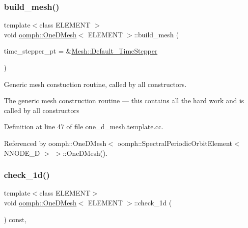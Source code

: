 \subsubsection{\texorpdfstring{build\+\_\+mesh()}{build\_mesh()}}
{\footnotesize\ttfamily template$<$class E\+L\+E\+M\+E\+NT $>$ \\
void \hyperlink{classoomph_1_1OneDMesh}{oomph\+::\+One\+D\+Mesh}$<$ E\+L\+E\+M\+E\+NT $>$\+::build\+\_\+mesh (\begin{DoxyParamCaption}\item[{\hyperlink{classoomph_1_1TimeStepper}{Time\+Stepper} $\ast$}]{time\+\_\+stepper\+\_\+pt = {\ttfamily \&\hyperlink{classoomph_1_1Mesh_a12243d0fee2b1fcee729ee5a4777ea10}{Mesh\+::\+Default\+\_\+\+Time\+Stepper}} }\end{DoxyParamCaption})\hspace{0.3cm}{\ttfamily [protected]}}



Generic mesh constuction routine, called by all constructors. 

The generic mesh construction routine --- this contains all the hard work and is called by all constructors 

Definition at line 47 of file one\+\_\+d\+\_\+mesh.\+template.\+cc.



Referenced by oomph\+::\+One\+D\+Mesh$<$ oomph\+::\+Spectral\+Periodic\+Orbit\+Element$<$ N\+N\+O\+D\+E\+\_\+D $>$ $>$\+::\+One\+D\+Mesh().

\mbox{\label{classoomph_1_1OneDMesh_a780eb2a0fdf02690aa5e93efe5ff3848}} 
\subsubsection{\texorpdfstring{check\+\_\+1d()}{check\_1d()}}
{\footnotesize\ttfamily template$<$class E\+L\+E\+M\+E\+NT$>$ \\
void \hyperlink{classoomph_1_1OneDMesh}{oomph\+::\+One\+D\+Mesh}$<$ E\+L\+E\+M\+E\+NT $>$\+::check\+\_\+1d (\begin{DoxyParamCaption}{ }\end{DoxyParamCaption}) const\hspace{0.3cm}{\ttfamily [inline]}, {\ttfamily [protected]}}


